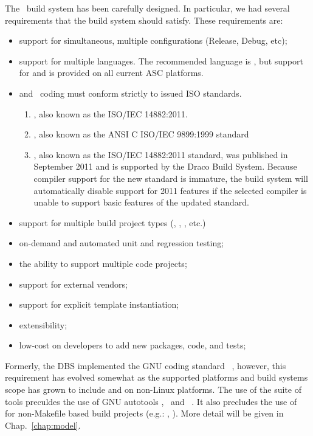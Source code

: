 The \draco\ build system has been carefully designed.  In particular,
we had several requirements that the build system should satisfy.
These requirements are:
\begin{itemize}
  \item support for simultaneous, multiple configurations (Release, Debug, etc);
  \item support for multiple languages. The recommended language is
    \cpp, but support for  and  is provided on
    all current ASC platforms.
  \item {} and \cpp\ coding must conform strictly to issued ISO
    standards. 
\begin{enumerate}
\item {}, also known as the ISO/IEC 14882:2011.
\item {}, also known as the ANSI C ISO/IEC 9899:1999 standard
\item {}, also known as the ISO/IEC 14882:2011 standard, was published in September 2011 and is
  supported by the Draco Build System.  Because compiler support for
  the new standard is immature, the build system will automatically
  disable support for 2011 features if the selected compiler is unable
  to support basic features of the updated standard.
\end{enumerate}
  \item support for multiple build project types (, , , etc.)
\item on-demand and automated unit and regression testing;
\item the ability to support multiple code projects;
\item support for external vendors;
  \item support for explicit template instantiation;
\item extensibility;
\item low-cost on developers to add new packages, code, and tests; 
\end{itemize}
Formerly, the DBS implemented the GNU coding standard~\cite{gnu}
, however, this requirement has evolved
somewhat as the supported platforms and build systems scope has grown
to include   and 
 on non-Linux platforms.  The use of the \cmake
{} suite of tools preculdes the use of GNU autotools
, \autoconf\ and \automake~\cite{autoconf}.  It
also precludes the use of \make~\cite{gmake} for non-Makefile based
build projects (e.g.: , ). More detail
will be given in Chap.~\ref{chap:model}.

